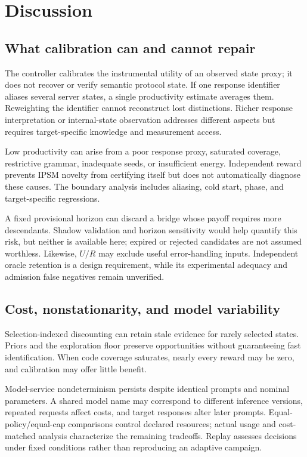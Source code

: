 \documentclass[final,5p,times,number]{elsarticle}
\begin{document}
\section{Discussion}
\subsection{What calibration can and cannot repair}
The controller calibrates the instrumental utility of an observed state proxy; it does not recover or verify semantic protocol state. If one response identifier aliases several server states, a single productivity estimate averages them. Reweighting the identifier cannot reconstruct lost distinctions. Richer response interpretation or internal-state observation addresses different aspects but requires target-specific knowledge and measurement access.

Low productivity can arise from a poor response proxy, saturated coverage, restrictive grammar, inadequate seeds, or insufficient energy. Independent reward prevents IPSM novelty from certifying itself but does not automatically diagnose these causes. The boundary analysis includes aliasing, cold start, phase, and target-specific regressions.

A fixed provisional horizon can discard a bridge whose payoff requires more descendants. Shadow validation and horizon sensitivity would help quantify this risk, but neither is available here; expired or rejected candidates are not assumed worthless. Likewise, $U/R$ may exclude useful error-handling inputs. Independent oracle retention is a design requirement, while its experimental adequacy and admission false negatives remain unverified.

\subsection{Cost, nonstationarity, and model variability}
Selection-indexed discounting can retain stale evidence for rarely selected states. Priors and the exploration floor preserve opportunities without guaranteeing fast identification. When code coverage saturates, nearly every reward may be zero, and calibration may offer little benefit.

Model-service nondeterminism persists despite identical prompts and nominal parameters. A shared model name may correspond to different inference versions, repeated requests affect costs, and target responses alter later prompts. Equal-policy/equal-cap comparisons control declared resources; actual usage and cost-matched analysis characterize the remaining tradeoffs. Replay assesses decisions under fixed conditions rather than reproducing an adaptive campaign.
\end{document}
